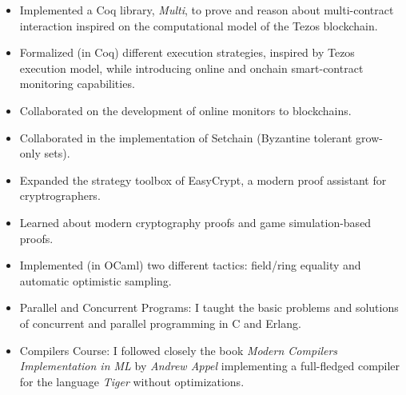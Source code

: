     \divider

    \begin{itemize}
        \item Implemented a Coq library,
            \emph{Multi}, to prove and reason about multi-contract
            interaction inspired on the computational model of the Tezos blockchain.
        \item Formalized (in Coq) different execution strategies, inspired by
            Tezos execution model, while introducing online and onchain smart-contract
            monitoring capabilities.
      \item Collaborated on the development of online monitors to blockchains.
      \item Collaborated in the implementation of Setchain (Byzantine tolerant grow-only sets).
    \end{itemize}
    \divider

    \begin{itemize}
        \item Expanded the strategy toolbox of
            EasyCrypt, a modern proof assistant for cryptrographers.
        \item Learned about modern cryptography proofs and game simulation-based proofs.
        \item Implemented (in OCaml) two different tactics: field/ring equality
            and automatic optimistic sampling.
    \end{itemize}

\newpage


    \begin{itemize}
        \item Parallel and Concurrent Programs: I taught the basic
            problems and solutions of concurrent and parallel programming in C and Erlang.
        \item Compilers Course: I followed closely the book \emph{Modern
                Compilers Implementation in ML} by \emph{Andrew Appel}
            implementing a full-fledged compiler for the language
            \emph{Tiger} without optimizations.
    \end{itemize}
    \divider

